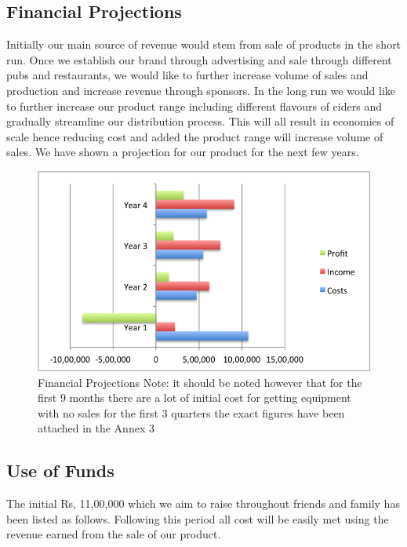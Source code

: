 \documentclass[11pt]{article}
\begin{document}
  \subsection{Financial Projections}
Initially our main source of revenue would stem from sale of products in the 
short run. Once we establish our brand through advertising and sale through 
different pubs and restaurants, we would like to further increase volume of 
sales and production and increase revenue through sponsors. In the long run we
would like to further increase our product range including different flavours 
of ciders and gradually streamline our distribution process. This will all 
result in economies of scale hence reducing cost and added the product range 
will increase volume of sales. We have shown a projection for our product for 
the next few years.

	\begin{figure}[H]
	\caption{Financial Projections \newline Note: it should be noted however that
for the first 9 months there are a lot of initial cost for getting equipment 
with no sales for the first 3 quarters \newline the exact figures have been 
attached in the Annex 3}
	\centering
	\includegraphics[width=\textwidth]{financialProjections.png}
	\end{figure}

  \subsection{Use of Funds}
The initial Rs, 11,00,000 which we aim to raise throughout friends and family
has been listed as follows. Following this period all cost will be easily met
using the revenue earned from the sale of our product.
\end{document}
